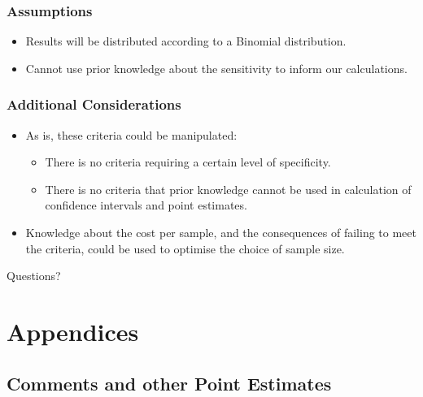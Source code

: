 \documentclass{beamer}\usepackage{knitr}
\begin{document}
\begin{frame}
  \frametitle{Assumptions}
  
  \begin{itemize}
    \item Results will be distributed according to a Binomial distribution.
    \item Cannot use prior knowledge about the sensitivity to inform our calculations.
  \end{itemize}
  
\end{frame}

\begin{frame}
  \frametitle{Additional Considerations}
  
  \begin{itemize}
    \item As is, these criteria could be manipulated:
      \begin{itemize}
        \item There is no criteria requiring a certain level of specificity.
        \item There is no criteria that prior knowledge cannot be used in calculation of confidence intervals and point estimates.
      \end{itemize}
    \item Knowledge about the cost per sample, and the consequences of failing to meet the criteria, could be used to optimise the choice of sample size.
  \end{itemize}
  
\end{frame}

\begin{frame}
{\Huge Questions?}
\end{frame}



\section{Appendices}


\subsection{Comments and other Point Estimates}
\end{document}
